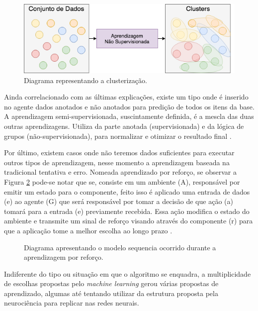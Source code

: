 \begin{figure}[!h]
    \centering
    \includegraphics[width=.8\textwidth]{imagens/unsupervised.png}
    \caption{Diagrama representando a clusterização.}
    \label{fig:unsupervised}
\end{figure}

Ainda correlacionado com as últimas explicações, existe um tipo onde é inserido no agente dados anotados e não anotados para predição de todos os itens da base. A aprendizagem semi-supervisionada, suscintamente definida, é a mescla das duas outras aprendizagens. Utiliza da parte anotada (supervisionada) e da lógica de grupos (não-supervisionada), para normalizar e otimizar o resultado final \cite[7]{mohri2012foundations}.

Por último, existem casos onde não teremos dados suficientes para executar outros tipos de aprendizagem, nesse momento a aprendizagem baseada na tradicional tentativa e erro. Nomeada aprendizado por reforço, se observar a Figura \ref{fig:reinforcement} pode-se notar que se, consiste em um ambiente (A), responsável por emitir um estado para o componente, feito isso é aplicado uma entrada de dados (e) ao agente (G) que será responsável por tomar a decisão de que ação (a) tomará para a entrada (e) previamente recebida. Essa ação modifica o estado do ambiente e transmite um sinal de reforço visando através do componente (r) para que a aplicação tome a melhor escolha ao longo prazo \cite{kaelbling1996reinforcement, russell2003artificial}.

\begin{figure}[!h]
    \centering
    \caption{Diagrama apresentando o modelo sequencia ocorrido durante a aprendizagem por reforço.}
    \label{fig:reinforcement}
\end{figure}

Indiferente do tipo ou situação em que o algoritmo se enquadra, a multiplicidade de escolhas propostas pelo \textit{machine learning} gerou várias propostas de aprendizado, algumas até tentando utilizar da estrutura proposta pela neurociência para replicar nas redes neurais.
